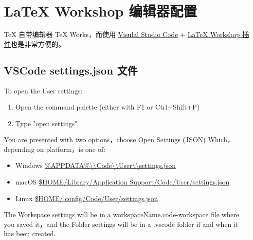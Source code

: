 \chapter{{\LaTeX} Workshop 编辑器配置}

{\TeX} 自带编辑器 {\TeX} Works，而使用 \href{https://code.visualstudio.com/}{Visulal Studio Code} +
\href{https://github.com/James-Yu/LaTeX-Workshop}{{\LaTeX} Workshop 插件}也是非常方便的。

\section{VSCode settings.json 文件}

To open the User settings:

\begin{enumerate}
\item Open the command palette (either with F1 or Ctrl+Shift+P)
\item Type "open settings"
\end{enumerate}

You are presented with two options，choose Open Settings (JSON)
Which，depending on platform，is one of:
\begin{itemize}
\item Windows \url{\%APPDATA\%\\Code\\User\\settings.json}
\item macOS \url{$HOME/Library/Application Support/Code/User/settings.json}
\item Linux \url{$HOME/.config/Code/User/settings.json}
\end{itemize}

The Workspace settings will be in a {workspaceName}.code-workspace file where you saved it，and the Folder settings will be in a .vscode folder if and when it has been created.

